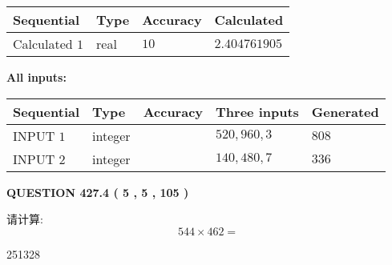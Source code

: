 \documentclass{ctexart}
\begin{document}
   
   
   
\noindent{}
   
   
  
  
\noindent\begin{tabular}{|l|l|l|l|}
\hline
 Sequential & Type & Accuracy & Calculated \\ 
\hline
 
 
  Calculated $  1 $ & real & $  10  $ & 
 $ 2.404761905 $ 
 \\  \hline  
 \end{tabular}
   
   
   
   
\noindent\vspace{0.1in}\hspace{-0.08in} {\textbf{\Large{All inputs: }}}
   
   
  
  
\noindent\begin{tabular}{|l|l|l|l|l|}
\hline
 Sequential & Type & Accuracy & Three inputs & Generated \\ 
\hline
 
 
  INPUT $  1 $ & integer &  & $
 520
 , 
 960
 , 
 3
 $ & $ 808 $ 
 \\  \hline  
 
 
  INPUT $  2 $ & integer &  & $
 140
 , 
 480
 , 
 7
 $ & $ 336 $ 
 \\  \hline  
 \end{tabular}
   
   
  
\vspace{0.2in}
  
{\textbf{\Large{QUESTION
427.4 
 ( 5 , 5 , 105 )
}}}
  
  
 
请计算:
\begin{equation}
544  \times    %
462 = \nonumber
\end{equation}
 
 
 
\noindent{}
 
 

251328
 
 
\noindent{}
 
 

 
 
 
\noindent{}
 
\end{document}
